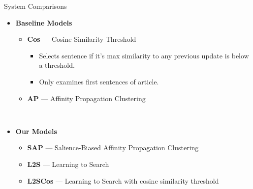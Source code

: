 \begin{frame}{System Comparisons}

  \begin{itemize}
    \item \textbf{Baseline Models}

    \begin{itemize}
        \item \textbf{Cos} --- Cosine Similarity Threshold
        \begin{itemize}
            \item Selects sentence if it's max similarity to any previous 
                  update is below a threshold.
            \item Only examines first sentences of article. 
        \end{itemize}
      \item \textbf{AP} --- Affinity Propagation Clustering
    \end{itemize}~\\
    \item \textbf{Our Models}
    \begin{itemize}
      \item \textbf{SAP} ---  Salience-Biased Affinity Propagation Clustering 
      \item \textbf{L2S} --- Learning to Search 
      \item \textbf{L2SCos} --- Learning to Search with cosine similarity 
                                threshold
    \end{itemize}
  \end{itemize}

\end{frame}

